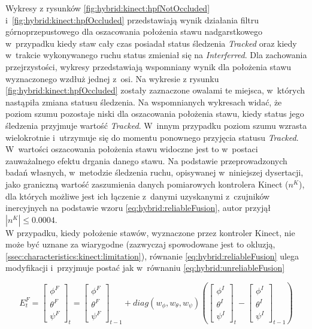 Wykresy z rysunków \ref{fig:hybrid:kinect:hpfNotOccluded} i~\ref{fig:hybrid:kinect:hpfOccluded} przedstawiają wynik działania filtru górnoprzepustowego dla oszacowania położenia stawu nadgarstkowego w~przypadku kiedy staw cały czas posiadał status śledzenia \emph{Tracked} oraz kiedy w~trakcie wykonywanego ruchu status zmieniał się na \emph{Interferred}. Dla zachowania przejrzystości, wykresy przedstawiają wspomniany wynik dla położenia stawu wyznaczonego wzdłuż jednej z~osi. Na wykresie z rysunku \ref{fig:hybrid:kinect:hpfOccluded} zostały zaznaczone owalami te miejsca, w~których nastąpiła zmiana statusu śledzenia. Na wspomnianych wykresach widać, że poziom szumu pozostaje niski dla oszacowania położenia stawu, kiedy status jego śledzenia przyjmuje wartość \emph{Tracked}. W~innym przypadku poziom szumu wzrasta wielokrotnie i~utrzymuje się do momentu ponownego przyjęcia statusu  \emph{Tracked}. W~wartości oszacowania położenia stawu widoczne jest to w~postaci zauważalnego efektu drgania danego stawu. Na podstawie przeprowadzonych badań własnych, w~metodzie śledzenia ruchu, opisywanej w~niniejszej dysertacji, jako graniczną wartość zaszumienia danych pomiarowych kontrolera Kinect ($n^K$), dla których możliwe jest ich łączenie z~danymi uzyskanymi z~czujników inercyjnych na podstawie wzoru \ref{eq:hybrid:reliableFusion}, autor przyjął $|n^K| \le 0.0004$.\\
																
W przypadku, kiedy położenie stawów, wyznaczone przez kontroler Kinect, nie może być uznane za wiarygodne (zazwyczaj spowodowane jest to okluzją, \ref{ssec:characteristics:kinect:limitation}), równanie \ref{eq:hybrid:reliableFusion} ulega modyfikacji i~przyjmuje postać jak w~równaniu \ref{eq:hybrid:unreliableFusion} 
																
\begin{equation} 
	\label{eq:hybrid:unreliableFusion}
	E^F_t = 
	\begin{bmatrix}  \phi^F \\  \theta^F \\  \psi^F \end{bmatrix}_t = 
	\begin{bmatrix}  \phi^F \\  \theta^F \\  \psi^F \end{bmatrix}_{t-1} +
	diag(w_\phi,w_\theta,w_\psi)
	(\begin{bmatrix}  \phi^I \\  \theta^I \\  \psi^I \end{bmatrix}_t -
	\begin{bmatrix}  \phi^I \\  \theta^I \\  \psi^I \end{bmatrix}_{t-1})
\end{equation}
																
